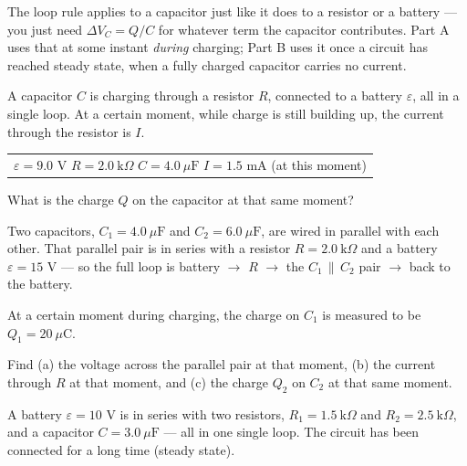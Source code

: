 \documentclass[12pt]{article}
\begin{document}

\noindent The loop rule applies to a capacitor just like it does to a
resistor or a battery --- you just need $\Delta V_C = Q/C$ for whatever
term the capacitor contributes. Part A uses that at some instant
\emph{during} charging; Part B uses it once a circuit has reached steady
state, when a fully charged capacitor carries no current.


\prob A capacitor $C$ is charging through a resistor $R$, connected to a
battery $\varepsilon$, all in a single loop. At a certain moment, while
charge is still building up, the current through the resistor is $I$.

\begin{center}
\begin{tabular}{l}
$\varepsilon = 9.0$ V \quad $R = 2.0\ \text{k}\Omega$ \quad $C = 4.0\ \mu\text{F}$ \quad $I = 1.5$ mA (at this moment)
\end{tabular}
\end{center}

\noindent What is the charge $Q$ on the capacitor at that same moment?


\prob Two capacitors, $C_1 = 4.0\ \mu\text{F}$ and $C_2 = 6.0\
\mu\text{F}$, are wired in parallel with each other. That parallel pair
is in series with a resistor $R = 2.0\ \text{k}\Omega$ and a battery
$\varepsilon = 15$ V --- so the full loop is battery $\to$ $R$ $\to$ the
$C_1\,\|\,C_2$ pair $\to$ back to the battery.

At a certain moment during charging, the charge on $C_1$ is measured to
be $Q_1 = 20\ \mu\text{C}$.

\noindent Find (a) the voltage across the parallel pair at that moment,
(b) the current through $R$ at that moment, and (c) the charge $Q_2$ on
$C_2$ at that same moment.


\clearpage

\prob A battery $\varepsilon = 10$ V is in series with two resistors,
$R_1 = 1.5\ \text{k}\Omega$ and $R_2 = 2.5\ \text{k}\Omega$, and a
capacitor $C = 3.0\ \mu\text{F}$ --- all in one single loop. The circuit
has been connected for a long time (steady state).
\end{document}
